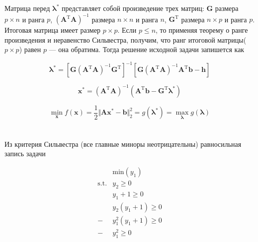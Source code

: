 	Матрица перед $\boldsymbol{\lambda}^{*}$ представляет собой произведение трех матриц: $\mathbf{G}$ размера $p\times n$ и ранга $p$, $(\mathbf{A}^{\text{T}}\mathbf{A})^{-1}$ размера $n\times n$ и ранга $n$, $\mathbf{G}^{\text{T}}$ размера $n\times p$ и ранга $p$. Итоговая матрица имеет размер $p \times p$. Если $p \leqslant n$, то применяя теорему о ранге произведения и неравенство Сильвестра, получим, что ранг итоговой матрицы($p \times p$) равен $p$ --- она обратима. Тогда решение исходной задачи запишется как
	
	\begin{equation}
	\boldsymbol{\lambda}^{*} =\left[ \mathbf{G}(\mathbf{A}^{\text{T}}\mathbf{A})^{-1}\mathbf{G}^{\text{T}}\right] ^{-1} \left[\mathbf{G}(\mathbf{A}^{\text{T}}\mathbf{A})^{-1}\mathbf{A}^{\text{T}}\mathbf{b} - \mathbf{h} \right] 
	\end{equation}
	
	\begin{equation}
	\mathbf{x}^{*} =(\mathbf{A}^{\text{T}}\mathbf{A})^{-1}(\mathbf{A}^{\text{T}}\mathbf{b} -\mathbf{G}^{\text{T}}\boldsymbol{\lambda}^{*})
	\end{equation}
	
	\begin{equation}
	\min_{\mathbf{x}} f(\mathbf{x}) = \frac 12 \Vert \mathbf{A}\mathbf{x}^{*}-\mathbf{b} \Vert_2^2 =  g(\boldsymbol{\lambda}^{*})=\max_{\boldsymbol{\lambda}} g(\boldsymbol{\lambda})
	\end{equation}
	
	\section{}
	
	\subsection{}

	Из критерия Сильвестра (все главные миноры неотрицательны) равносильная запись задачи
	
	\begin{equation}
	\begin{split}
	&\text{min}( y_1)\\
	\text{s.t.}&y_2 \geqslant 0\\
	&y_1+1 \geqslant 0\\
	&y_2(y_1+1) \geqslant 0\\
	-&y_1^2(y_1+1) \geqslant 0\\
	-&y_1^2 \geqslant 0
	\end{split}
	\end{equation}
	
